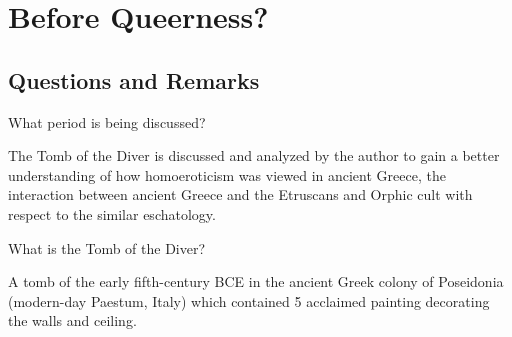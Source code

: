 %
%
%
\chapter{Before Queerness?}
\label{befQueer} %








\abstract{}

\section{Questions and Remarks}
\label{sec:QR3}

\begin{qst}
    What period is being discussed?
\end{qst}
The Tomb of the Diver is discussed and analyzed by the author to gain a better understanding of how homoeroticism was viewed in ancient Greece, the interaction between ancient Greece and the Etruscans and Orphic cult with respect to the similar eschatology.



\begin{qst}
    What is the Tomb of the Diver?
\end{qst}
A tomb of the early fifth-century BCE in the ancient Greek colony of Poseidonia (modern-day Paestum, Italy) which contained 5 acclaimed painting decorating the walls and ceiling.

